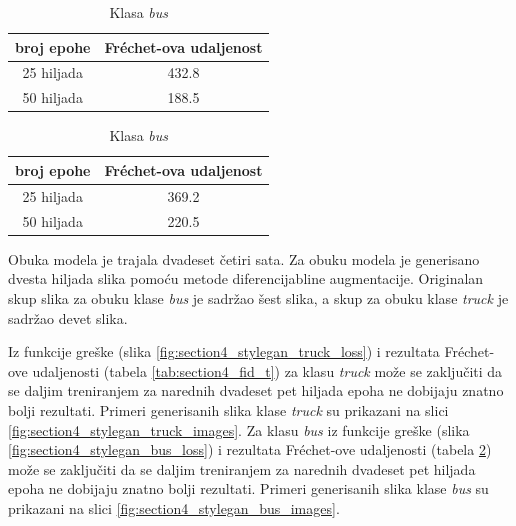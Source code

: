\documentclass[12pt,oneside]{memoir}
\begin{document}
\begin{table}[!htb]
    \begin{minipage}{.5\linewidth}
      \caption{Klasa \textit{truck}}\label{tab:section4_fid_t}
      \centering
        \begin{tabular}{c|c}
        broj epohe &  Fréchet-ova udaljenost \\
        \hline
        25 hiljada & 432.8 \\
        \hline
        50 hiljada & 188.5 \\
        \end{tabular}
    \end{minipage}
    \begin{minipage}{.5\linewidth}
      \centering
        \caption{Klasa \textit{bus}}\label{tab:section4_fid_b}
        \begin{tabular}{c|c}
        broj epohe &  Fréchet-ova udaljenost \\
        \hline
        25 hiljada & 369.2 \\
        \hline
        50 hiljada & 220.5 \\
        \end{tabular}
    \end{minipage} 
\end{table}

Obuka modela je trajala dvadeset četiri sata. Za obuku modela je generisano dvesta hiljada slika pomoću metode diferencijabline augmentacije. Originalan skup slika za obuku klase \textit{bus} je sadržao šest slika, a skup za obuku klase \textit{truck} je sadržao devet slika.

Iz funkcije greške (slika \ref{fig:section4_stylegan_truck_loss}) i rezultata Fréchet-ove udaljenosti (tabela \ref{tab:section4_fid_t}) za klasu \textit{truck} može se zaključiti da se daljim treniranjem za narednih dvadeset pet hiljada epoha ne dobijaju znatno bolji rezultati. %
Primeri generisanih slika klase \textit{truck} su prikazani na slici \ref{fig:section4_stylegan_truck_images}.
Za klasu \textit{bus} iz funkcije greške (slika \ref{fig:section4_stylegan_bus_loss}) i rezultata Fréchet-ove udaljenosti (tabela \ref{tab:section4_fid_b}) može se zaključiti da se daljim treniranjem za narednih dvadeset pet hiljada epoha ne dobijaju znatno bolji rezultati. Primeri generisanih slika klase \textit{bus} su prikazani na slici \ref{fig:section4_stylegan_bus_images}.
\end{document}
